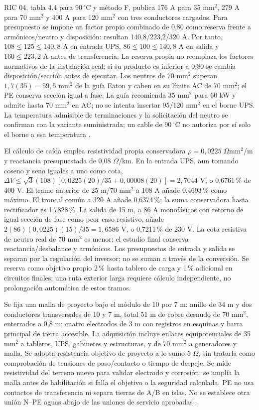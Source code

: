 RIC 04, tabla 4.4 para 90\,$^{\circ}$C y método F, publica 176 A para 35 mm$^2$, 279 A para 70 mm$^2$ y 400 A para 120 mm$^2$ con tres conductores cargados. Para presupuesto se impone un factor propio combinado de 0,80 como reserva frente a armónicos/neutro y disposición: resultan 140,8/223,2/320 A. Por tanto, $108\leq125\leq140,8$ A en entrada UPS, $86\leq100\leq140,8$ A en salida y $160\leq223,2$ A antes de transferencia. La reserva propia no reemplaza los factores normativos de la instalación real; si su producto es inferior a 0,80 se cambia disposición/sección antes de ejecutar. Los neutros de 70 mm$^2$ superan $1,7(35)=59,5$ mm$^2$ de la guía Eaton y caben en su límite AC de 70 mm$^2$; el PE conserva sección igual a fase. La guía recomienda 35 mm$^2$ para 60 kW y admite hasta 70 mm$^2$ en AC; no se intenta insertar 95/120 mm$^2$ en el borne UPS. La temperatura admisible de terminaciones y la solicitación del neutro se confirman con la variante suministrada; un cable de 90\,$^{\circ}$C no autoriza por sí solo el borne a esa temperatura \parencites[tabla~4.4, pp.~19--21]{lote10-sec-ric04}[pp.~34--35]{p7-eaton-93t-guia}.

El cálculo de caída emplea resistividad propia conservadora $\rho=0,0225$ $\Omega$mm$^2$/m y reactancia presupuestada de 0,08 $\Omega$/km. En la entrada UPS, aun tomando coseno y seno iguales a uno como cota, $\Delta V\leq\sqrt{3}(108)[0,0225(20)/35+0,00008(20)]=2,7044$ V, o 0,6761\,\% de 400 V. El tramo anterior de 25 m/70 mm$^2$ a 108 A añade 0,4693\,\% como máximo. El troncal común a 320 A añade 0,6374\,\%; la suma conservadora hasta rectificador es 1,7828\,\%. La salida de 15 m, a 86 A monofásicos con retorno de igual sección de fase como peor caso resistivo, añade $2(86)(0,0225)(15)/35=1,6586$ V, o 0,7211\,\% de 230 V. La cota resistiva de neutro real de 70 mm$^2$ es menor; el estudio final conserva reactancia/desbalance y armónicos. Los presupuestos de entrada y salida se separan por la regulación del inversor; no se suman a través de la conversión. Se reserva como objetivo propio 2\,\% hasta tablero de carga y 1\,\% adicional en circuitos finales; una ruta exterior larga requiere cálculo independiente, no prolongación automática de estos tramos.

Se fija una malla de proyecto bajo el módulo de 10 por 7 m: anillo de 34 m y dos conductores transversales de 10 y 7 m, total 51 m de cobre desnudo de 70 mm$^2$, enterrados a 0,8 m; cuatro electrodos de 3 m con registros en esquinas y barra principal de tierra accesible. La adquisición incluye enlaces equipotenciales de 35 mm$^2$ a tableros, UPS, gabinetes y estructuras, y de 70 mm$^2$ a generadores y malla. Se adopta resistencia objetivo de proyecto a lo sumo 5 $\Omega$, sin tratarla como comprobación de tensiones de paso/contacto o tiempo de despeje. Se mide resistividad del terreno nuevo para validar electrodo y corrosión; se amplía la malla antes de habilitación si falla el objetivo o la seguridad calculada. PE no usa contactos de transferencia ni separa tierras de A/B en islas. No se establece otra unión N--PE aguas abajo de las uniones de servicio aprobadas \parencite[secc.~5--8 y 12]{lote13-sec-ric06}.


